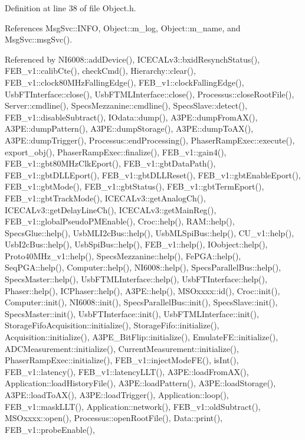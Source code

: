 Definition at line 38 of file Object.\+h.



References Msg\+Svc\+::\+I\+N\+FO, Object\+::m\+\_\+log, Object\+::m\+\_\+name, and Msg\+Svc\+::msg\+Svc().



Referenced by N\+I6008\+::add\+Device(), I\+C\+E\+C\+A\+Lv3\+::bxid\+Resynch\+Status(), F\+E\+B\+\_\+v1\+::calib\+Cte(), check\+Cmd(), Hierarchy\+::clear(), F\+E\+B\+\_\+v1\+::clock80\+M\+Hz\+Falling\+Edge(), F\+E\+B\+\_\+v1\+::clock\+Falling\+Edge(), Usb\+F\+T\+Interface\+::close(), Usb\+F\+T\+M\+L\+Interface\+::close(), Processus\+::close\+Root\+File(), Server\+::cmdline(), Specs\+Mezzanine\+::cmdline(), Specs\+Slave\+::detect(), F\+E\+B\+\_\+v1\+::disable\+Subtract(), I\+Odata\+::dump(), A3\+P\+E\+::dump\+From\+A\+X(), A3\+P\+E\+::dump\+Pattern(), A3\+P\+E\+::dump\+Storage(), A3\+P\+E\+::dump\+To\+A\+X(), A3\+P\+E\+::dump\+Trigger(), Processus\+::end\+Processing(), Phaser\+Ramp\+Exec\+::execute(), export\+\_\+obj(), Phaser\+Ramp\+Exec\+::finalize(), F\+E\+B\+\_\+v1\+::gain4(), F\+E\+B\+\_\+v1\+::gbt80\+M\+Hz\+Clk\+Eport(), F\+E\+B\+\_\+v1\+::gbt\+Data\+Path(), F\+E\+B\+\_\+v1\+::gbt\+D\+L\+L\+Eport(), F\+E\+B\+\_\+v1\+::gbt\+D\+L\+L\+Reset(), F\+E\+B\+\_\+v1\+::gbt\+Enable\+Eport(), F\+E\+B\+\_\+v1\+::gbt\+Mode(), F\+E\+B\+\_\+v1\+::gbt\+Status(), F\+E\+B\+\_\+v1\+::gbt\+Term\+Eport(), F\+E\+B\+\_\+v1\+::gbt\+Track\+Mode(), I\+C\+E\+C\+A\+Lv3\+::get\+Analog\+Ch(), I\+C\+E\+C\+A\+Lv3\+::get\+Delay\+Line\+Ch(), I\+C\+E\+C\+A\+Lv3\+::get\+Main\+Reg(), F\+E\+B\+\_\+v1\+::global\+Pseudo\+P\+M\+Enable(), Croc\+::help(), R\+A\+M\+::help(), Specs\+Glue\+::help(), Usb\+M\+L\+I2c\+Bus\+::help(), Usb\+M\+L\+Spi\+Bus\+::help(), C\+U\+\_\+v1\+::help(), Usb\+I2c\+Bus\+::help(), Usb\+Spi\+Bus\+::help(), F\+E\+B\+\_\+v1\+::help(), I\+Oobject\+::help(), Proto40\+M\+Hz\+\_\+v1\+::help(), Specs\+Mezzanine\+::help(), Fe\+P\+G\+A\+::help(), Seq\+P\+G\+A\+::help(), Computer\+::help(), N\+I6008\+::help(), Specs\+Parallel\+Bus\+::help(), Specs\+Master\+::help(), Usb\+F\+T\+M\+L\+Interface\+::help(), Usb\+F\+T\+Interface\+::help(), Phaser\+::help(), I\+C\+Phaser\+::help(), A3\+P\+E\+::help(), M\+S\+Oxxxx\+::id(), Croc\+::init(), Computer\+::init(), N\+I6008\+::init(), Specs\+Parallel\+Bus\+::init(), Specs\+Slave\+::init(), Specs\+Master\+::init(), Usb\+F\+T\+Interface\+::init(), Usb\+F\+T\+M\+L\+Interface\+::init(), Storage\+Fifo\+Acquisition\+::initialize(), Storage\+Fifo\+::initialize(), Acquisition\+::initialize(), A3\+P\+E\+\_\+\+Bit\+Flip\+::initialize(), Emulate\+F\+E\+::initialize(), A\+D\+C\+Measurement\+::initialize(), Current\+Measurement\+::initialize(), Phaser\+Ramp\+Exec\+::initialize(), F\+E\+B\+\_\+v1\+::inject\+Mode\+F\+E(), is\+Int(), F\+E\+B\+\_\+v1\+::latency(), F\+E\+B\+\_\+v1\+::latency\+L\+L\+T(), A3\+P\+E\+::load\+From\+A\+X(), Application\+::load\+History\+File(), A3\+P\+E\+::load\+Pattern(), A3\+P\+E\+::load\+Storage(), A3\+P\+E\+::load\+To\+A\+X(), A3\+P\+E\+::load\+Trigger(), Application\+::loop(), F\+E\+B\+\_\+v1\+::mask\+L\+L\+T(), Application\+::network(), F\+E\+B\+\_\+v1\+::old\+Subtract(), M\+S\+Oxxxx\+::open(), Processus\+::open\+Root\+File(), Data\+::print(), F\+E\+B\+\_\+v1\+::probe\+Enable(), 